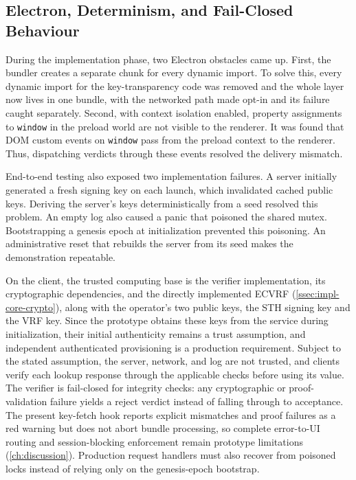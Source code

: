 \subsection{Electron, Determinism, and Fail-Closed Behaviour}\label{ssec:apiref-eng-robust}

During the implementation phase, two Electron obstacles came up. First, the bundler creates a
separate chunk for every dynamic import. To solve this, every dynamic import for the
key-transparency code was removed and the whole layer now lives in one bundle, with the networked
path made opt-in and its failure caught separately. Second, with context isolation enabled,
property assignments to \texttt{window} in the preload world are not visible to the renderer. It
was found that DOM custom events on \texttt{window} pass from the preload context to the renderer.
Thus, dispatching verdicts through these events resolved the delivery mismatch.

End-to-end testing also exposed two implementation failures. A server initially generated a fresh
signing key on each launch, which invalidated cached public keys. Deriving the server's keys
deterministically from a seed resolved this problem. An empty log also caused a panic that poisoned
the shared mutex. Bootstrapping a genesis epoch at initialization prevented this poisoning. An
administrative reset that rebuilds the server from its seed makes the demonstration repeatable.

On the client, the trusted computing
base is the verifier implementation, its cryptographic dependencies, and the directly implemented
ECVRF (\cref{ssec:impl-core-crypto}), along with the operator's two public keys, the STH signing
key and the VRF key. Since the prototype obtains these keys from the service during initialization,
their initial authenticity remains a trust assumption, and independent authenticated provisioning is a
production requirement. Subject to the stated assumption, the server, network, and log are not
trusted, and clients verify each lookup response through the applicable checks before using its
value. The verifier is fail-closed for integrity checks: any cryptographic or
proof-validation failure yields a reject verdict instead of falling through to acceptance. The present
key-fetch hook reports explicit mismatches and proof failures as a red warning but does not abort bundle
processing, so complete error-to-UI routing and session-blocking enforcement remain prototype
limitations (\cref{ch:discussion}). Production request handlers must also recover from poisoned locks
instead of relying only on the genesis-epoch bootstrap.

